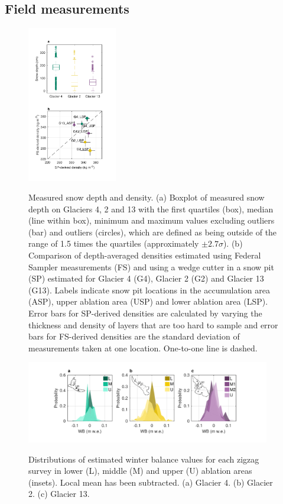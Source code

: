 \documentclass[twocolumn, letterpaper]{igs}
\begin{document}
\subsection{Field measurements}

\begin{figure}
	\centering
	\includegraphics[width =0.35\textwidth]{DepthBoxplot_SPvsFS.pdf}\\
	\caption{Measured snow depth and density. (a) Boxplot of measured snow depth on Glaciers 4, 2 and 13 with the first quartiles (box), median (line within box), minimum and maximum values excluding outliers (bar) and outliers (circles), which are defined as being outside of the range of 1.5 times the quartiles (approximately $\pm2.7\sigma$). (b) Comparison of depth-averaged densities estimated using Federal Sampler measurements (FS) and using a wedge cutter in a snow pit (SP) estimated for Glacier 4 (G4), Glacier 2 (G2) and Glacier 13 (G13). Labels indicate snow pit locations in the accumulation area (ASP), upper ablation area (USP) and lower ablation area (LSP). Error bars for SP-derived densities are calculated by varying the thickness and density of layers that are too hard to sample and error bars for FS-derived densities are the standard deviation of measurements taken at one location. One-to-one line is dashed.}
	\label{fig:DepthBoxplot_SPvsFS}
\end{figure}

\begin{figure}
	\centering
	\includegraphics[width =0.95\textwidth]{ZigzagHistogram.pdf}\\
	\caption{Distributions of estimated winter balance values for each zigzag survey in lower (L), middle (M) and upper (U) ablation areas (insets). Local mean has been subtracted. (a) Glacier 4. (b) Glacier 2. (c) Glacier 13.}
	\label{fig:ZigzagHistogram}
\end{figure}
\end{document}
